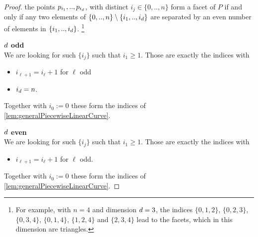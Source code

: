 \begin{proof}

  the points $p_{i_1}, .., p_{i_d}$,
  with distinct $i_j \in \{0,..,n\}$ form a facet of $P$ if and only if 
  any two elements of $\{0,..,n\} \setminus \{i_1, .., i_d\}$
  are separated by an even number of elements in $\{i_1, .., i_d\}$.%
  \footnote{
    For example,
    with $n=4$ and dimension $d=3$,
    the indices $\{0,1,2\}$, $\{0,2,3\}$, $\{0,3,4\}$, $\{0,1,4\}$, $\{1,2,4\}$ and $\{2,3,4\}$
    lead to the facets, which in this dimension are triangles.
  }
  
  \textbf{$d$ odd}\\
  We are looking for such $\{i_j\}$ such that $i_1 \ge 1$.
  Those are exactly the indices with
  \begin{itemize}
    \item $i_{\ell+1} = i_\ell + 1$ for $\ell$ odd
    \item $i_d = n$.
  \end{itemize}
  Together with $i_0 := 0$ these form the indices of \autoref{lem:generalPiecewiseLinearCurve}.


  \textbf{$d$ even}\\
  We are looking for such $\{i_j\}$ such that $i_1 \ge 1$.
  Those are exactly the indices with
  \begin{itemize}
    \item $i_{\ell+1} = i_\ell + 1$ for $\ell$ odd.
  \end{itemize}
  Together with $i_0 := 0$ these form the indices of \autoref{lem:generalPiecewiseLinearCurve}.


\end{proof}
